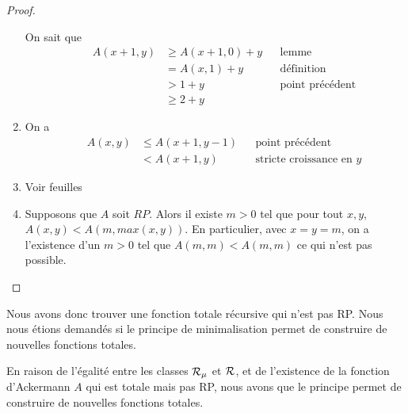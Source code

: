 \begin{proof}
\begin{enumerate}
			On sait que
			\begin{align}
				&& A(x + 1, y) & \geq A(x + 1, 0) + y && \text{lemme} \\
				&& & = A(x, 1) + y && \text{définition} \\
				&& & > 1 + y && \text{point précédent} \\
				&& & \geq 2 + y &&
			\end{align}
		\item On a
			\begin{align}
				&& A(x, y) & \leq A(x + 1, y - 1) && \text{point précédent} \\
				&& & < A(x + 1, y) && \text{stricte croissance en $y$}
			\end{align}
		\item Voir feuilles
		\item Supposons que $A$ soit $RP$. Alors il existe $m > 0$ tel que pour
			tout $x, y$, $A(x, y) < A(m, max(x, y))$. En particulier, avec $x =
			y = m$, on a
			l'existence d'un $m > 0$ tel que $A(m, m) < A(m, m)$ ce qui n'est
			pas possible.
	\end{enumerate}
\end{proof}
\fi

Nous avons donc trouver une fonction totale récursive qui n'est pas RP. Nous
nous étions demandés si le principe de minimalisation permet de construire de
nouvelles fonctions totales.

En raison de l'égalité entre les classes
$\mathcal{R}_{\mu}$ et $\mathcal{R}$, et de l'existence de la
fonction d'Ackermann $A$ qui est totale mais pas RP, nous avons que le principe
permet de construire de nouvelles fonctions totales.
